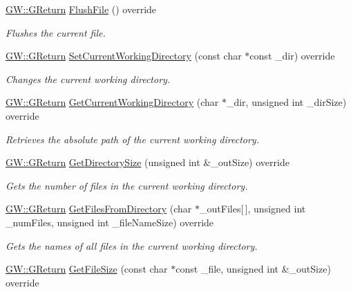 \begin{DoxyCompactItemize}
\hyperlink{namespaceGW_a67a839e3df7ea8a5c5686613a7a3de21}{G\+W\+::\+G\+Return} \hyperlink{classFileIO_a8e5afdb1a734f37e422ff0147561a3a1}{Flush\+File} () override
\begin{DoxyCompactList}\small\item\em Flushes the current file. \end{DoxyCompactList}\item 
\hyperlink{namespaceGW_a67a839e3df7ea8a5c5686613a7a3de21}{G\+W\+::\+G\+Return} \hyperlink{classFileIO_a8332ededccf4034fd83509d9513a2635}{Set\+Current\+Working\+Directory} (const char $\ast$const \+\_\+dir) override
\begin{DoxyCompactList}\small\item\em Changes the current working directory. \end{DoxyCompactList}\item 
\hyperlink{namespaceGW_a67a839e3df7ea8a5c5686613a7a3de21}{G\+W\+::\+G\+Return} \hyperlink{classFileIO_a41a1859ffe3ebd76005f264af0b1ea66}{Get\+Current\+Working\+Directory} (char $\ast$\+\_\+dir, unsigned int \+\_\+dir\+Size) override
\begin{DoxyCompactList}\small\item\em Retrieves the absolute path of the current working directory. \end{DoxyCompactList}\item 
\hyperlink{namespaceGW_a67a839e3df7ea8a5c5686613a7a3de21}{G\+W\+::\+G\+Return} \hyperlink{classFileIO_ae331f6c02948720d9cc5bcd2700d8cf7}{Get\+Directory\+Size} (unsigned int \&\+\_\+out\+Size) override
\begin{DoxyCompactList}\small\item\em Gets the number of files in the current working directory. \end{DoxyCompactList}\item 
\hyperlink{namespaceGW_a67a839e3df7ea8a5c5686613a7a3de21}{G\+W\+::\+G\+Return} \hyperlink{classFileIO_afd1b77afed3d853aaa01f14ecbc6b0e0}{Get\+Files\+From\+Directory} (char $\ast$\+\_\+out\+Files\mbox{[}$\,$\mbox{]}, unsigned int \+\_\+num\+Files, unsigned int \+\_\+file\+Name\+Size) override
\begin{DoxyCompactList}\small\item\em Gets the names of all files in the current working directory. \end{DoxyCompactList}\item 
\hyperlink{namespaceGW_a67a839e3df7ea8a5c5686613a7a3de21}{G\+W\+::\+G\+Return} \hyperlink{classFileIO_a91ee3ceabd5d6097eed85466c26d2adb}{Get\+File\+Size} (const char $\ast$const \+\_\+file, unsigned int \&\+\_\+out\+Size) override

\end{DoxyCompactItemize}
